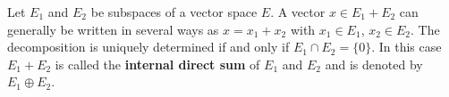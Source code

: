Let $E_1$ and $E_2$ be subspaces of a vector space $E$. A vector $x \in E_1 + E_2$ can generally be written in several ways as $x = x_1 + x_2$ with $x_1 \in E_1$, $x_2 \in E_2$. The decomposition is uniquely determined if and only if $E_1 \cap E_2 = \{0\}$. In this case $E_1 + E_2$ is called the \textbf{internal direct sum} of $E_1$ and $E_2$ and is denoted by $E_1 \oplus E_2$.
